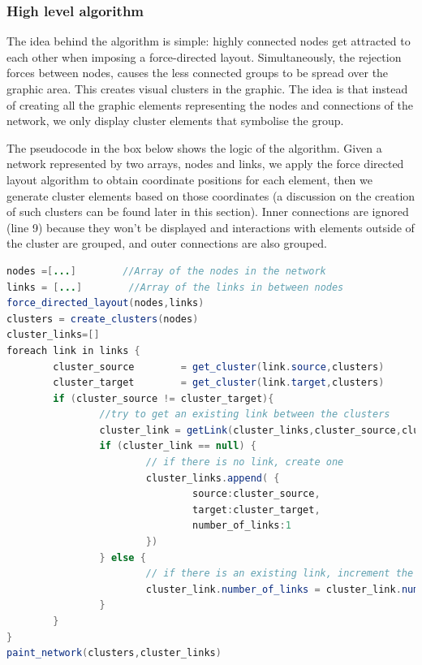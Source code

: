 \subsubsection{High level algorithm}
The idea behind the algorithm is simple: highly connected nodes get attracted to each other when imposing a force-directed layout. Simultaneously, the rejection forces between nodes, causes the less connected groups to be spread over the graphic area. This creates visual clusters in the graphic. The idea is that instead of creating all the graphic elements representing the nodes and connections of the network, we only display cluster elements that symbolise the group.

The pseudocode in the box below shows the logic of the algorithm. Given a network represented by two arrays, nodes and links, we apply the force directed layout algorithm to obtain coordinate positions for each element, then we generate cluster elements based on those coordinates (a discussion on the creation of such clusters can be found later in this section). Inner connections are ignored (line 9) because they won't be displayed and interactions with elements outside of the cluster are grouped,  and outer connections are also grouped.

\begin{lstlisting}[language=java]%,float,floatplacement=H]
nodes =[...]        //Array of the nodes in the network
links = [...]        //Array of the links in between nodes
force_directed_layout(nodes,links) 
clusters = create_clusters(nodes)
cluster_links=[]
foreach link in links {
        cluster_source        = get_cluster(link.source,clusters)
        cluster_target        = get_cluster(link.target,clusters)
        if (cluster_source != cluster_target){
                //try to get an existing link between the clusters
                cluster_link = getLink(cluster_links,cluster_source,cluster_target) 
                if (cluster_link == null) {
                        // if there is no link, create one
                        cluster_links.append( {
                                source:cluster_source, 
                                target:cluster_target, 
                                number_of_links:1
                        })
                } else {
                        // if there is an existing link, increment the number of links between the clusters
                        cluster_link.number_of_links = cluster_link.number_of_links +1
                }
        }
}
paint_network(clusters,cluster_links)
\end{lstlisting}

